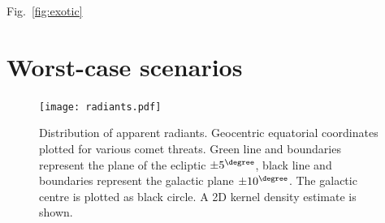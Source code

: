 Fig.~\ref{fig:exotic}

\section{Worst-case scenarios}

\begin{figure}[t!]
    \centering
    \texttt{[image: radiants.pdf]}
    \caption[Distribution of apparent radiants]{Distribution of apparent radiants. Geocentric equatorial coordinates plotted for various comet threats. Green line and boundaries represent the plane of the ecliptic $\pm5^\degree$, black line and boundaries represent the galactic plane $\pm10^\degree$. The galactic centre is plotted as black circle. A 2D kernel density estimate is shown.}
    \label{fig:loss_cone}
\end{figure}

